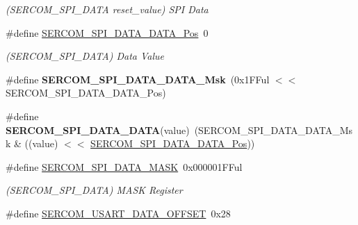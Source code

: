 \begin{DoxyCompactItemize}
\begin{DoxyCompactList}\small\item\em (S\+E\+R\+C\+O\+M\+\_\+\+S\+P\+I\+\_\+\+D\+A\+T\+A reset\+\_\+value) S\+P\+I Data \end{DoxyCompactList}\item 
\hypertarget{group___s_a_m_l21___s_e_r_c_o_m_ga2bc3a8d8660c1c7eaf18928fb7214cf3}{}\#define \hyperlink{group___s_a_m_l21___s_e_r_c_o_m_ga2bc3a8d8660c1c7eaf18928fb7214cf3}{S\+E\+R\+C\+O\+M\+\_\+\+S\+P\+I\+\_\+\+D\+A\+T\+A\+\_\+\+D\+A\+T\+A\+\_\+\+Pos}~0\label{group___s_a_m_l21___s_e_r_c_o_m_ga2bc3a8d8660c1c7eaf18928fb7214cf3}

\begin{DoxyCompactList}\small\item\em (S\+E\+R\+C\+O\+M\+\_\+\+S\+P\+I\+\_\+\+D\+A\+T\+A) Data Value \end{DoxyCompactList}\item 
\hypertarget{group___s_a_m_l21___s_e_r_c_o_m_gaa4d1e0723a5c13d88e442cef9e637c11}{}\#define {\bfseries S\+E\+R\+C\+O\+M\+\_\+\+S\+P\+I\+\_\+\+D\+A\+T\+A\+\_\+\+D\+A\+T\+A\+\_\+\+Msk}~(0x1\+F\+Ful $<$$<$ S\+E\+R\+C\+O\+M\+\_\+\+S\+P\+I\+\_\+\+D\+A\+T\+A\+\_\+\+D\+A\+T\+A\+\_\+\+Pos)\label{group___s_a_m_l21___s_e_r_c_o_m_gaa4d1e0723a5c13d88e442cef9e637c11}

\item 
\hypertarget{group___s_a_m_l21___s_e_r_c_o_m_ga9c93081c778346554599502a56bfe854}{}\#define {\bfseries S\+E\+R\+C\+O\+M\+\_\+\+S\+P\+I\+\_\+\+D\+A\+T\+A\+\_\+\+D\+A\+T\+A}(value)~(S\+E\+R\+C\+O\+M\+\_\+\+S\+P\+I\+\_\+\+D\+A\+T\+A\+\_\+\+D\+A\+T\+A\+\_\+\+Msk \& ((value) $<$$<$ \hyperlink{group___s_a_m_l21___s_e_r_c_o_m_ga2bc3a8d8660c1c7eaf18928fb7214cf3}{S\+E\+R\+C\+O\+M\+\_\+\+S\+P\+I\+\_\+\+D\+A\+T\+A\+\_\+\+D\+A\+T\+A\+\_\+\+Pos}))\label{group___s_a_m_l21___s_e_r_c_o_m_ga9c93081c778346554599502a56bfe854}

\item 
\hypertarget{group___s_a_m_l21___s_e_r_c_o_m_ga5945fdb340e8178f48da71de4665d391}{}\#define \hyperlink{group___s_a_m_l21___s_e_r_c_o_m_ga5945fdb340e8178f48da71de4665d391}{S\+E\+R\+C\+O\+M\+\_\+\+S\+P\+I\+\_\+\+D\+A\+T\+A\+\_\+\+M\+A\+S\+K}~0x000001\+F\+Ful\label{group___s_a_m_l21___s_e_r_c_o_m_ga5945fdb340e8178f48da71de4665d391}

\begin{DoxyCompactList}\small\item\em (S\+E\+R\+C\+O\+M\+\_\+\+S\+P\+I\+\_\+\+D\+A\+T\+A) M\+A\+S\+K Register \end{DoxyCompactList}\item 
\hypertarget{group___s_a_m_l21___s_e_r_c_o_m_ga4e1a7443e7d7e188c59693b917e3e139}{}\#define \hyperlink{group___s_a_m_l21___s_e_r_c_o_m_ga4e1a7443e7d7e188c59693b917e3e139}{S\+E\+R\+C\+O\+M\+\_\+\+U\+S\+A\+R\+T\+\_\+\+D\+A\+T\+A\+\_\+\+O\+F\+F\+S\+E\+T}~0x28\label{group___s_a_m_l21___s_e_r_c_o_m_ga4e1a7443e7d7e188c59693b917e3e139}


\end{DoxyCompactItemize}
